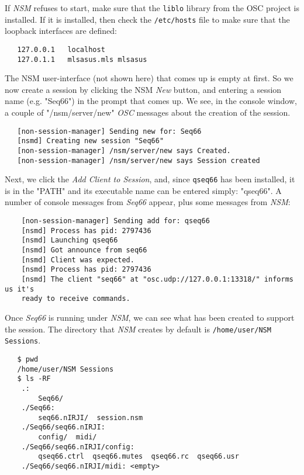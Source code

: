    If \textsl{NSM} refuses to start, make sure that the \texttt{liblo} library
   from the OSC project is installed.  If it is installed, then check the
   \texttt{/etc/hosts} file to make sure that the loopback interfaces are
   defined:

\begin{verbatim}
   127.0.0.1   localhost
   127.0.1.1   mlsasus.mls mlsasus
\end{verbatim}

   The NSM user-interface (not shown here) that comes up is empty at first.  So
   we now create a session by clicking the NSM \textsl{New} button, and
   entering a session name (e.g. "Seq66") in the prompt that comes up.  We see,
   in the console window, a couple of "/nsm/server/new" \textsl{OSC} messages
   about the creation of the session.

\begin{verbatim}
   [non-session-manager] Sending new for: Seq66
   [nsmd] Creating new session "Seq66"
   [non-session-manager] /nsm/server/new says Created.
   [non-session-manager] /nsm/server/new says Session created
\end{verbatim}

   Next, we click the \textsl{Add Client to Session}, and, since
   \texttt{qseq66} has been installed, it is in the "PATH" and its executable
   name can be entered simply: "qseq66".  A number of console messages from
   \textsl{Seq66} appear, plus some messages from \textsl{NSM}:

\begin{verbatim}
	[non-session-manager] Sending add for: qseq66
	[nsmd] Process has pid: 2797436
	[nsmd] Launching qseq66
	[nsmd] Got announce from seq66
	[nsmd] Client was expected.
	[nsmd] Process has pid: 2797436
	[nsmd] The client "seq66" at "osc.udp://127.0.0.1:13318/" informs us it's
    ready to receive commands.
\end{verbatim}

	Once \textsl{Seq66} is running under \textsl{NSM}, we can see what has
   been created to support the session.  The directory that \textsl{NSM}
   creates by default is \texttt{/home/user/NSM Sessions}.

\begin{verbatim}
   $ pwd
   /home/user/NSM Sessions
   $ ls -RF
	.:
		Seq66/
	./Seq66:
		seq66.nIRJI/  session.nsm
	./Seq66/seq66.nIRJI:
		config/  midi/
	./Seq66/seq66.nIRJI/config:
		qseq66.ctrl  qseq66.mutes  qseq66.rc  qseq66.usr
	./Seq66/seq66.nIRJI/midi: <empty>
\end{verbatim}

